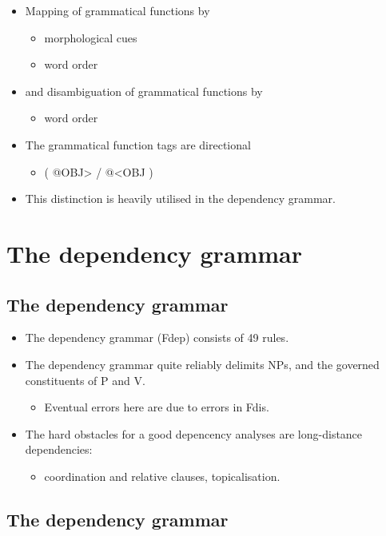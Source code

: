 \documentclass{article}
\begin{document}
\begin{itemize}
\item Mapping of grammatical functions by
\begin{itemize}
\item morphological cues
\item word order
\end{itemize}
\item and disambiguation of grammatical functions by
\begin{itemize}
\item word order \\ 
\end{itemize}
\item The grammatical function tags are directional 
\begin{itemize}
\item ( @OBJ> / @<OBJ )
\end{itemize}
\item This distinction is heavily utilised in the dependency grammar.
\end{itemize}\section{The dependency grammar}
\subsection{The dependency grammar}

\begin{itemize}
\item The dependency grammar (Fdep) consists of 49 rules. 
\item The dependency grammar quite reliably delimits NPs, and the governed constituents of P and V. 
\begin{itemize}
\item Eventual errors here are due to errors in Fdis. 
\end{itemize}
\item The hard obstacles for a good depencency analyses are long-distance dependencies: 
\begin{itemize}
\item coordination and relative clauses, topicalisation.
\end{itemize}
\end{itemize}

\subsection{The dependency grammar}
\end{document}
